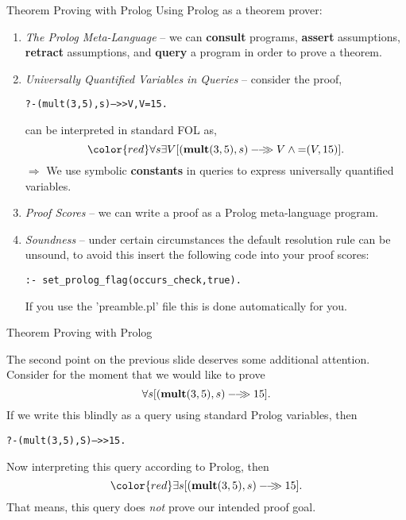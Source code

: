 \documentclass{beamer}
\begin{document}
\begin{frame}[fragile]{Theorem Proving with Prolog}
\scriptsize
Using Prolog as a theorem prover:
\begin{enumerate}

\item
{\em The Prolog Meta-Language} -- we can {\bf consult} programs, {\bf assert} assumptions,
{\bf retract} assumptions, and {\bf query} a program in order to prove a theorem.

\item
{\em Universally Quantified Variables in Queries} -- consider the proof,
{\scriptsize
\begin{alltt}
?- (mult(3,5),s) -->> V, V = 15.
\end{alltt}
}
 can be interpreted in standard FOL
as,
\[
{\color{red}\forall s} \exists V[(\sem{{\bf mult}(3,5),s)} {V} \wedge {\bf =}(V,15)].
\]
$\Rightarrow$ We use symbolic {\bf constants} in queries to express universally quantified variables.

\item
{\em Proof Scores} -- we can write a proof as a Prolog meta-language program.

\item
{\em Soundness} -- under certain circumstances the default resolution rule can be unsound, to avoid
this insert the following code into your proof scores:
\begin{verbatim}
:- set_prolog_flag(occurs_check,true).
\end{verbatim}
If you use the 'preamble.pl' file this is done automatically for you.
\end{enumerate}
\end{frame}

\begin{frame}[fragile]{Theorem Proving with Prolog}

\small
The second point on the previous slide deserves some additional attention.  Consider for the moment that
we would like to prove
\[
\forall s [{({\bf mult}(3,5),s)}-\!\!-\!\!\!\!\gg{15}].
\]
If we write this blindly as a query using standard Prolog variables, then
{\scriptsize
\begin{alltt}
?- (mult(3,5),{\color{red}S}) -->> 15.
\end{alltt}
}
Now interpreting this query according to Prolog, then
\[
{\color{red}\exists s} [\sem{({\bf mult}(3,5),s)}{15}].
\]
That means, this query does {\em not} prove our intended proof goal.
\end{frame}
\end{document}
